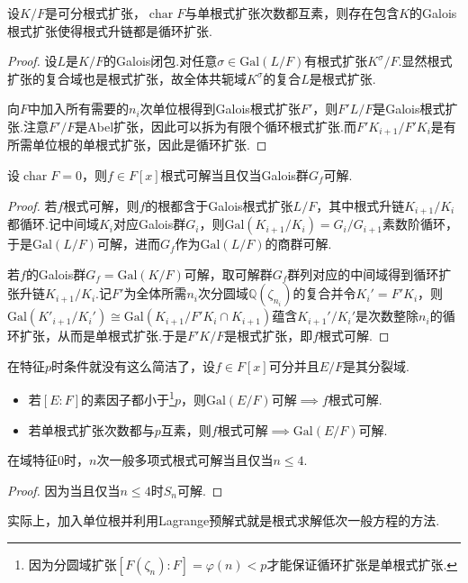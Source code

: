 \begin{lemma*}
    设$K/F$是可分根式扩张，$\operatorname*{char}F$与单根式扩张次数都互素，则存在包含$K$的Galois根式扩张使得根式升链都是循环扩张.
\end{lemma*}
\begin{proof}
    设$L$是$K/F$的Galois闭包.对任意$\sigma\in\mathrm{Gal}(L/F)$有根式扩张$K^\sigma/F$.显然根式扩张的复合域也是根式扩张，故全体共轭域$K^\sigma$的复合$L$是根式扩张.

    向$F$中加入所有需要的$n_i$次单位根得到Galois根式扩张$F'$，则$F'L/F$是Galois根式扩张.注意$F'/F$是Abel扩张，因此可以拆为有限个循环根式扩张.而$F'K_{i+1}/F'K_i$是有所需单位根的单根式扩张，因此是循环扩张.
\end{proof}
\begin{thm}[(Galois)]
    设$\operatorname*{char}F=0$，则$f\in F[x]$根式可解当且仅当Galois群$G_f$可解.
\end{thm}
\begin{proof}
    若$f$根式可解，则$f$的根都含于Galois根式扩张$L/F$，其中根式升链$K_{i+1}/K_i$都循环.记中间域$K_i$对应Galois群$G_i$，则$\mathrm{Gal}(K_{i+1}/K_i)=G_i/G_{i+1}$素数阶循环，于是$\mathrm{Gal}(L/F)$可解，进而$G_f$作为$\mathrm{Gal}(L/F)$的商群可解.

    若$f$的Galois群$G_f=\mathrm{Gal}(K/F)$可解，取可解群$G_f$群列对应的中间域得到循环扩张升链$K_{i+1}/K_i$.记$F'$为全体所需$n_i$次分圆域$\mathbb{Q}(\zeta_{n_i})$的复合并令$K_i'=F'K_i$，则$\mathrm{Gal}(K'_{i+1}/K_i')\cong\mathrm{Gal}(K_{i+1}/F'K_i\cap K_{i+1})$蕴含$K_{i+1}'/K_i'$是次数整除$n_i$的循环扩张，从而是单根式扩张.于是$F'K/F$是根式扩张，即$f$根式可解.
\end{proof}
\begin{remark}
    在特征$p$时条件就没有这么简洁了，设$f\in F[x]$可分并且$E/F$是其分裂域.
    \begin{itemize}
        \item 若$[E:F]$的素因子都小于\footnote{因为分圆域扩张$[F(\zeta_n):F]=\varphi(n)<p$才能保证循环扩张是单根式扩张.}$p$，则$\mathrm{Gal}(E/F)$可解$\implies f$根式可解.
        \item 若单根式扩张次数都与$p$互素，则$f$根式可解$\implies\mathrm{Gal}(E/F)$可解.
    \end{itemize}
\end{remark}
\begin{cor*}
    在域特征$0$时，$n$次一般多项式根式可解当且仅当$n\le 4$.
\end{cor*}
\begin{proof}
    因为当且仅当$n\le 4$时$S_n$可解.
\end{proof}

实际上，加入单位根并利用Lagrange预解式就是根式求解低次一般方程的方法.
